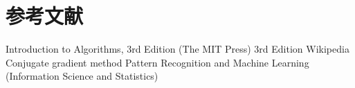 \section{参考文献}

\begin{thebibliography}{99}
    Introduction to Algorithms, 3rd Edition (The MIT Press) 3rd Edition
    Wikipedia Conjugate gradient method
    Pattern Recognition and Machine Learning (Information Science and Statistics)
\end{thebibliography}
